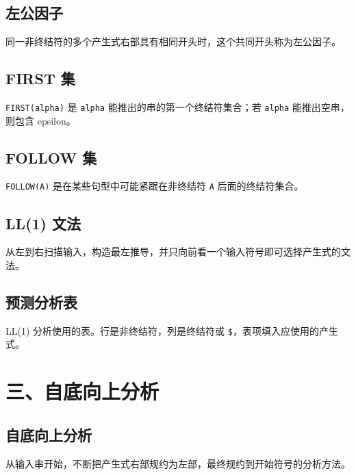 \documentclass[UTF8,zihao=-4]{ctexart}
\begin{document}
\subsection*{左公因子}

同一非终结符的多个产生式右部具有相同开头时，这个共同开头称为左公因子。

\subsection*{FIRST 集}

\texttt{FIRST(alpha)} 是 \texttt{alpha} 能推出的串的第一个终结符集合；若 \texttt{alpha} 能推出空串，则包含 epsilon。

\subsection*{FOLLOW 集}

\texttt{FOLLOW(A)} 是在某些句型中可能紧跟在非终结符 \texttt{A} 后面的终结符集合。

\subsection*{LL(1) 文法}

从左到右扫描输入，构造最左推导，并只向前看一个输入符号即可选择产生式的文法。

\subsection*{预测分析表}

LL(1) 分析使用的表。行是非终结符，列是终结符或 \texttt{\$}，表项填入应使用的产生式。

\section*{三、自底向上分析}

\subsection*{自底向上分析}

从输入串开始，不断把产生式右部规约为左部，最终规约到开始符号的分析方法。
\end{document}
